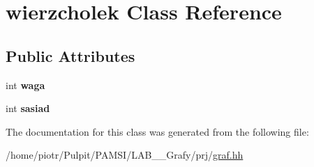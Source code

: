 \hypertarget{classwierzcholek}{\section{wierzcholek \-Class \-Reference}
\label{classwierzcholek}
}
\subsection*{\-Public \-Attributes}
\begin{DoxyCompactItemize}
\item 
\hypertarget{classwierzcholek_a3c53d7c09f6e83be8808bd78d6221e08}{int {\bfseries waga}}\label{classwierzcholek_a3c53d7c09f6e83be8808bd78d6221e08}

\item 
\hypertarget{classwierzcholek_a98e829ee47a4e9ecb342f513cb5a2baa}{int {\bfseries sasiad}}\label{classwierzcholek_a98e829ee47a4e9ecb342f513cb5a2baa}

\end{DoxyCompactItemize}


\-The documentation for this class was generated from the following file\-:\begin{DoxyCompactItemize}
\item 
/home/piotr/\-Pulpit/\-P\-A\-M\-S\-I/\-L\-A\-B\-\_\-\_\-\-Grafy/prj/\hyperlink{graf_8hh}{graf.\-hh}\end{DoxyCompactItemize}
